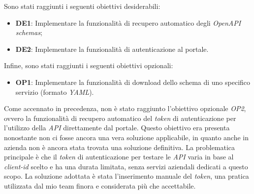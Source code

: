 Sono stati raggiunti i seguenti obiettivi desiderabili:
\begin{itemize}
  \item \textbf{DE1}:  Implementare la funzionalità di recupero automatico degli \textit{OpenAPI schemas};
  \item \textbf{DE2}: Implementare la funzionalità di autenticazione al portale.
\end{itemize}

Infine, sono stati raggiunti i seguenti obiettivi opzionali:
\begin{itemize}
  \item \textbf{OP1}: Implementare la funzionalità di download dello schema di uno specifico servizio (formato \textit{YAML}).
\end{itemize}

Come accennato in precedenza, non è stato raggiunto l'obiettivo opzionale \textit{OP2}, ovvero la funzionalità di recupero automatico del \textit{token} di autenticazione per l'utilizzo della \textit{API} direttamente dal portale.
Questo obiettivo era presenta nonostante non ci fosse ancora una vera soluzione applicabile, in quanto anche in azienda non è ancora stata trovata una soluzione definitiva.
La problematica principale è che il \textit{token} di autenticazione per testare le \textit{API} varia in base al \textit{client-id} scelto e ha una durata limitata, senza servizi aziendali dedicati a questo scopo. La soluzione adottata è stata l'inserimento manuale del \textit{token}, una pratica utilizzata dal mio team finora e considerata più che accettabile.
